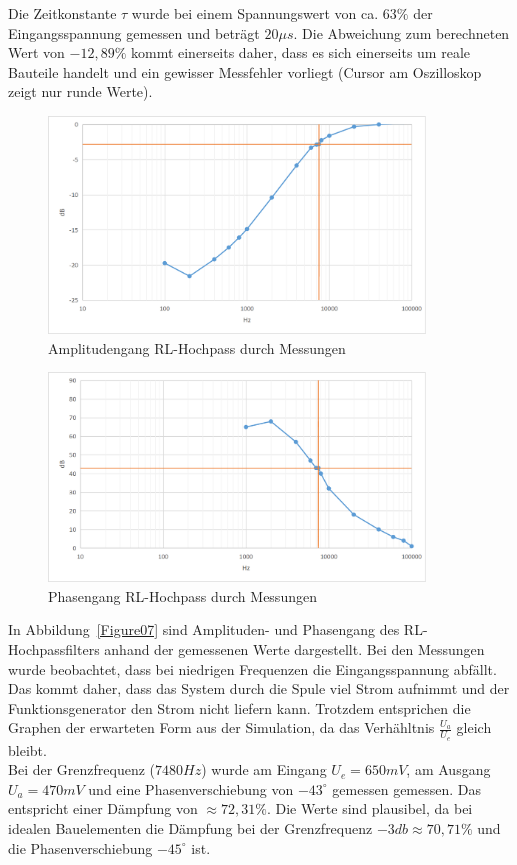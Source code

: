 \documentclass[12pt,a4paper,titlepage]{article}
\begin{document}
\noindent Die Zeitkonstante $\tau$ wurde bei einem Spannungswert von ca. $63 \%$ der Eingangsspannung gemessen und betr\"agt $20 \mu s$. Die Abweichung zum berechneten Wert von $-12,89 \%$ kommt einerseits daher, dass es sich einerseits um reale Bauteile handelt und ein gewisser Messfehler vorliegt (Cursor am Oszilloskop zeigt nur runde Werte).

\begin{figure}[H]
  \centering
  \includegraphics[width=100mm]{amplitudengang_rl_hochpass.png}
  \caption{Amplitudengang RL-Hochpass durch Messungen}
  \label{Figure08}
\end{figure}
\begin{figure}[H]
  \centering
  \includegraphics[width=100mm]{phasengang_rl_hochpass.png}
  \caption{Phasengang RL-Hochpass durch Messungen}
  \label{Figure09}
\end{figure}
\noindent In Abbildung~\ref{Figure07} sind Amplituden- und Phasengang des RL-Hochpassfilters anhand der gemessenen Werte dargestellt. Bei den Messungen wurde beobachtet, dass bei niedrigen Frequenzen die Eingangsspannung abf\"allt. Das kommt daher, dass das System durch die Spule viel Strom aufnimmt und der Funktionsgenerator den Strom nicht liefern kann. Trotzdem entsprichen die Graphen  der erwarteten Form aus der Simulation, da das Verh\"ahltnis $\frac{U_a}{U_e}$ gleich bleibt. \\
Bei der Grenzfrequenz ($7480 Hz$) wurde am Eingang $U_e = 650mV$, am Ausgang $U_a = 470mV$ und eine Phasenverschiebung von $-43^{\circ}$ gemessen gemessen. Das entspricht einer D\"ampfung von $\approx 72,31\%$. Die Werte sind plausibel, da bei idealen Bauelementen die D\"ampfung bei der Grenzfrequenz $-3db \approx 70,71\%$ und die Phasenverschiebung $-45^{\circ}$ ist.
\end{document}
